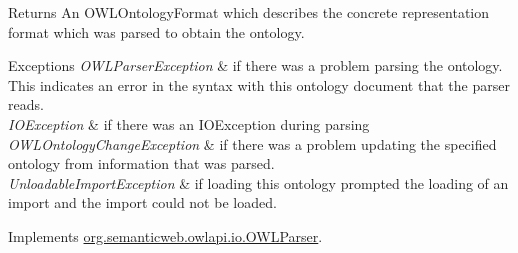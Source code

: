 \begin{DoxyReturn}{Returns}
An {\ttfamily O\-W\-L\-Ontology\-Format} which describes the concrete representation format which was parsed to obtain the ontology. 
\end{DoxyReturn}

\begin{DoxyExceptions}{Exceptions}
{\em O\-W\-L\-Parser\-Exception} & if there was a problem parsing the ontology. This indicates an error in the syntax with this ontology document that the parser reads. \\
\hline
{\em I\-O\-Exception} & if there was an I\-O\-Exception during parsing \\
\hline
{\em O\-W\-L\-Ontology\-Change\-Exception} & if there was a problem updating the specified ontology from information that was parsed. \\
\hline
{\em Unloadable\-Import\-Exception} & if loading this ontology prompted the loading of an import and the import could not be loaded. \\
\hline
\end{DoxyExceptions}


Implements \hyperlink{interfaceorg_1_1semanticweb_1_1owlapi_1_1io_1_1_o_w_l_parser_a2d4a9b4fc9206b0661fbd2c8ee0e1f3b}{org.\-semanticweb.\-owlapi.\-io.\-O\-W\-L\-Parser}.

